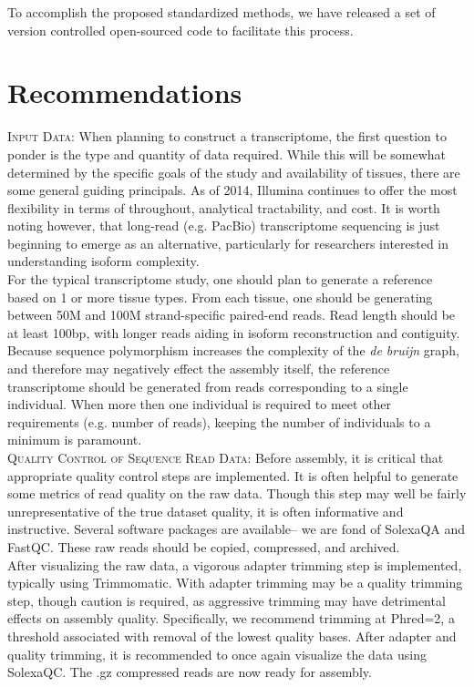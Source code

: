 \documentclass[11pt]{article}
\begin{document}
To accomplish the proposed standardized methods, we have released a set of version controlled open-sourced code to facilitate this process.   

\section*{Recommendations}

\textsc{Input Data}: When planning to construct a transcriptome, the first question to ponder is the type and quantity of data required. While this will be somewhat determined by the specific goals of the study and availability of tissues, there are some general guiding principals. As of 2014, Illumina continues to offer the most flexibility in terms of throughout, analytical tractability, and cost. It is worth noting however, that long-read (e.g. PacBio) transcriptome sequencing is just beginning to emerge as an alternative, particularly for researchers interested in understanding  isoform complexity. \\

For the typical transcriptome study, one should plan to generate a reference based on 1 or more tissue types. From each tissue, one should be generating between 50M and 100M strand-specific paired-end reads. Read length should be at least 100bp, with longer reads aiding in isoform reconstruction and contiguity. Because sequence polymorphism increases the complexity of the \textit{de bruijn} graph, and therefore may negatively effect the assembly itself, the reference transcriptome should be generated from reads corresponding to a single individual. When more then one individual is required to meet other requirements (e.g. number of reads), keeping the number of individuals to a minimum is paramount. \\

\textsc{Quality Control of Sequence Read Data}: Before assembly, it is critical that appropriate quality control steps are implemented. It is often helpful to generate some metrics of read quality on the raw data. Though this step may well be fairly unrepresentative of the true dataset quality, it is often informative and instructive. Several software packages are available-- we are fond of SolexaQA and FastQC. These raw reads should be copied, compressed, and archived. \\

After visualizing the raw data, a vigorous adapter trimming step is implemented, typically using Trimmomatic. With adapter trimming may be a quality trimming step, though caution is required, as aggressive trimming may have detrimental effects on assembly quality. Specifically, we recommend trimming at Phred=2, a threshold associated with removal of the lowest quality bases. After adapter and quality trimming, it is recommended to once again visualize the data using SolexaQC. The .gz compressed reads are now ready for assembly. \\
\end{document}
